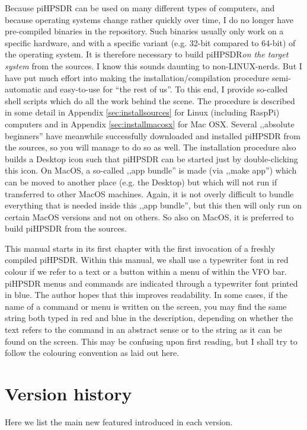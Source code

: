 \documentclass[12pt]{book}
\def\pH{pi\-HPSDR\xspace}
\begin{document}
Because \pH can be used on many different types of computers, and because operating systems change
rather quickly over time, I do no longer have pre-compiled binaries in the repository. Such binaries
usually only work on a specific hardware, and with a specific variant (e.g. 32-bit compared to 64-bit) of
the operating system. It is therefore necessary to build \pH \textit{on the target system}
from the sources. I know this sounds daunting to non-LINUX-nerds. But I have put much effort into making
the installation/compilation procedure semi-automatic and easy-to-use for ``the rest of us''.
To this end, I provide so-called shell scripts which do all the work behind the scene.
The procedure is described in some detail in Appendix \ref{sec:installsources} for Linux (including RaspPi)
computers and in Appendix \ref{sec:installmacosx} for Mac OSX. Several ,,absolute beginners'' have meanwhile
successfully downloaded and installed \pH from the sources, so you will manage to do so as well.
The installation procedure also builds a Desktop icon such that \pH can be started just by double-clicking
this icon.
On MacOS,
a so-called ,,app bundle'' is made (via ,,make app'') which can be moved to another place (e.g. the Desktop)
but which will not run if transferred to other MacOS machines. Again, it is not overly difficult
to bundle everything that is needed inside this ,,app bundle'', but this then will only run on certain
MacOS versions and not on others. So also on MacOS, it is preferred to build \pH from the sources.

This manual starts in its first chapter with the first invocation of a freshly compiled \pH.
Within this manual, we shall use a typewriter font in red colour if we refer to a text or a button within
a menu of within the VFO bar. \pH menus and commands are indicated through a typewriter font
printed in blue. The author hopes that this improves readability. In some cases, if the name of a command
or  menu is written on the screen, you may find the same string both typed in red and blue in the
description, depending on whether the text refers to the command in an abstract sense or to the string as it
can be found on the screen. This may be confusing upon first reading, but I shall try to follow the colouring
convention as laid out here.

\clearpage
\section{Version history}
\label{sec:versionhistory}
Here we list the main new featured introduced in each version.
\end{document}
